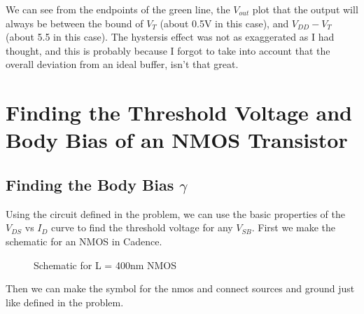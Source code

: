 \documentclass[12pt]{article}
\begin{document}
We can see from the endpoints of the green line, the $V_{out}$ plot that the output will always be between the bound of
$V_T$ (about 0.5V in this case), and $V_{DD} - V_T$ (about 5.5 in this case). The hystersis effect was not as exaggerated
as I had thought, and this is probably because I forgot to take into account that the overall deviation from an ideal buffer,
isn't that great.
\pagebreak



\section{Finding the Threshold Voltage and Body Bias of an NMOS Transistor}
\subsection{Finding the Body Bias $\gamma$}
Using the circuit defined in the problem, we can use the basic properties of the $V_{DS}$ vs $I_{D}$ curve to find the threshold voltage
for any $V_{SB}$. First we make the schematic for an NMOS in Cadence.
\begin{figure} [H]
    \centering
    \caption{Schematic for L = 400nm NMOS}
\end{figure}
Then we can make the symbol for the nmos and connect sources and ground just like defined in the problem.
\end{document}
